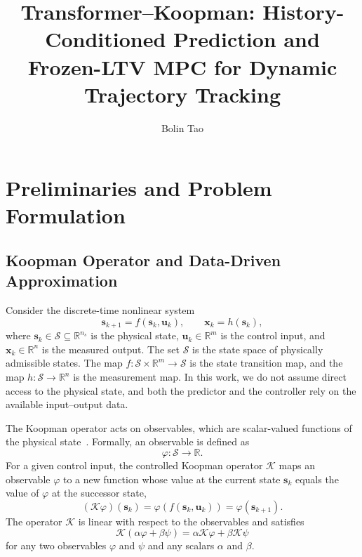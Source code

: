 \documentclass[journal]{IEEEtran}
\newcommand{\vx}{\mathbf{x}}
\newcommand{\vu}{\mathbf{u}}
\newcommand{\vs}{\mathbf{s}}
\newcommand{\R}{\mathbb{R}}
\theoremstyle{plain}
\theoremstyle{definition}
\theoremstyle{definition}
\begin{document}
\title{Transformer--Koopman: History-Conditioned Prediction and Frozen-LTV MPC for Dynamic Trajectory Tracking}
\author{Bolin Tao}
\maketitle

\setcounter{section}{1} %

\section{Preliminaries and Problem Formulation}
\label{sec:prelim}

\subsection{Koopman Operator and Data-Driven Approximation}
\label{subsec:koopman_prelim}

Consider the discrete-time nonlinear system
\begin{equation}
\vs_{k+1}=f(\vs_k,\vu_k),\qquad
\vx_k=h(\vs_k),
\label{eq:nonlinear_system}
\end{equation}
where $\vs_k\in\mathcal S\subseteq\R^{n_s}$ is the physical state, $\vu_k\in\R^m$ is the control input, and $\vx_k\in\R^n$ is the measured output. The set $\mathcal S$ is the state space of physically admissible states. The map $f:\mathcal S\times\R^m\to\mathcal S$ is the state transition map, and the map $h:\mathcal S\to\R^n$ is the measurement map. In this work, we do not assume direct access to the physical state, and both the predictor and the controller rely on the available input--output data.

The Koopman operator acts on observables, which are scalar-valued
functions of the physical state~\cite{koopman1931hamiltonian,mezic2005spectral,brunton2022modern}. Formally, an observable is defined as
\begin{equation}
\varphi:\mathcal S\to\R.
\label{eq:observable}
\end{equation}
For a given control input, the controlled Koopman operator
$\mathcal K$ maps an observable $\varphi$ to a new function
whose value at the current state $\vs_k$ equals the value
of $\varphi$ at the successor state,
\begin{equation}
(\mathcal K\varphi)(\vs_k)
=\varphi\!\left(f(\vs_k,\vu_k)\right)
=\varphi(\vs_{k+1}).
\label{eq:koopman_operator}
\end{equation}
The operator $\mathcal K$ is linear with respect to the
observables and satisfies
\begin{equation}
\mathcal K(\alpha\varphi+\beta\psi)
=\alpha\mathcal K\varphi+\beta\mathcal K\psi
\label{eq:koopman_linearity}
\end{equation}
for any two observables $\varphi$ and $\psi$ and any
scalars $\alpha$ and $\beta$.
\end{document}
